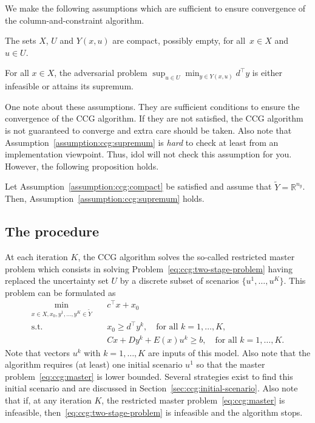 We make the following assumptions which are sufficient to ensure convergence
of the column-and-constraint algorithm. 

\begin{assumption}
    \label{assumption:ccg:compact}
    The sets $X$, $U$ and $Y(x,u)$ are compact, possibly empty, for all~$x\in
    X$ and~\mbox{$u\in U$}.
\end{assumption}

\begin{assumption}
    \label{assumption:ccg:supremum}
    For all $x\in X$, the adversarial problem $\sup_{u\in U} \min_{y\in
    Y(x,u)} d^\top y$ is either infeasible or attains its supremum. 
\end{assumption}

One note about these assumptions. They are sufficient conditions to ensure the
convergence of the CCG algorithm. If they are not satisfied, the CCG algorithm
is not guaranteed to converge and extra care should be taken. Also note that
Assumption~\ref{assumption:ccg:supremum} is \emph{hard} to check at least from
an implementation viewpoint. Thus, \textsf{idol} will not check this
assumption for you. However, the following proposition holds.

\begin{proposition}
    Let Assumption~\ref{assumption:ccg:compact} be satisfied and assume that
    $\tilde{Y} = \mathbb{R}^{n_y}$. Then,
    Assumption~\ref{assumption:ccg:supremum} holds.
\end{proposition}

\subsection{The procedure}

At each iteration $K$, the CCG algorithm solves the so-called restricted
master problem which consists in solving
Problem~\eqref{eq:ccg:two-stage-problem} having replaced the uncertainty set
$U$ by a discrete subset of scenarios $\{ u^1, \dotsc, u^K \}$. This problem
can be formulated as  
\begin{subequations}
    \label{eq:ccg:master}
    \begin{align}
        \min_{x\in X, x_0, y^1, \dotsc, y^K\in\tilde{Y}} \quad & c^\top x + x_0 \\
        \text{s.t.} \quad & x_0 \ge d^\top y^k, \quad \text{for all } k=1,\dotsc,K, \\
        & Cx + Dy^k + E(x)u^k \ge b, \quad \text{for all } k=1,\dotsc,K.
    \end{align}
\end{subequations}
Note that vectors $u^k$ with $k=1,\dotsc,K$ are inputs of this model. Also
note that the algorithm requires (at least) one initial scenario $u^1$ so that
the master problem~\eqref{eq:ccg:master} is lower bounded. Several strategies
exist to find this initial scenario and are discussed in
Section~\ref{sec:ccg:initial-scenario}. Also note that if, at any iteration
$K$, the restricted master problem~\eqref{eq:ccg:master} is infeasible,
then~\eqref{eq:ccg:two-stage-problem} is infeasible and the algorithm stops.

